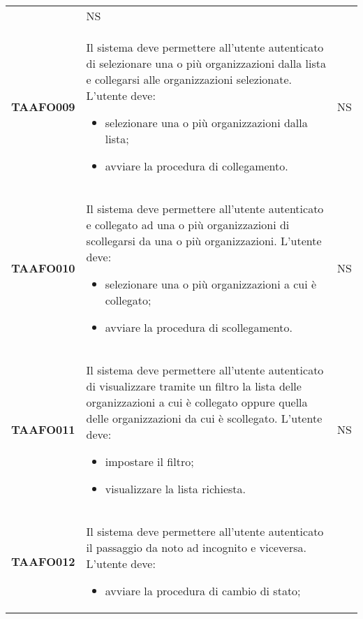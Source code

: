 \documentclass[../piano-di-qualifica.tex]{subfiles}
\begin{document}
\begin{centering}
\begin{longtable}[H]{>{\centering\bfseries}m{3cm} >{}p{10cm} >{\centering\arraybackslash}m{3cm}}
\begin{itemize}
                        \end{itemize}
                      & NS \\
        TAAFO009      & Il sistema deve permettere all’utente autenticato di selezionare una o più organizzazioni dalla lista e collegarsi alle organizzazioni selezionate. \newline
                        L’utente deve:
                        \begin{itemize}
                          \item selezionare una o più organizzazioni dalla lista;
                          \item avviare la procedura di collegamento.
                        \end{itemize}
                      & NS \\
        TAAFO010      & Il sistema deve permettere all’utente autenticato e collegato ad una o più organizzazioni di scollegarsi da una o più organizzazioni. \newline
                        L’utente deve:
                        \begin{itemize}
                          \item selezionare una o più organizzazioni a cui è collegato;
                          \item avviare la procedura di scollegamento.
                        \end{itemize}
                      & NS \\
        TAAFO011      & Il sistema deve permettere all’utente autenticato di visualizzare tramite un filtro la lista delle organizzazioni a cui è collegato oppure quella delle organizzazioni da cui è scollegato. \newline
                      L’utente deve:
                      \begin{itemize}
                        \item impostare il filtro;
                        \item visualizzare la lista richiesta.
                      \end{itemize}
                      & NS \\
        TAAFO012      & Il sistema deve permettere all’utente autenticato il passaggio da noto ad incognito e viceversa. \newline
                      L’utente deve:
                      \begin{itemize}
                        \item avviare la procedura di cambio di stato;

\end{itemize}
\end{longtable}
\end{centering}
\end{document}
